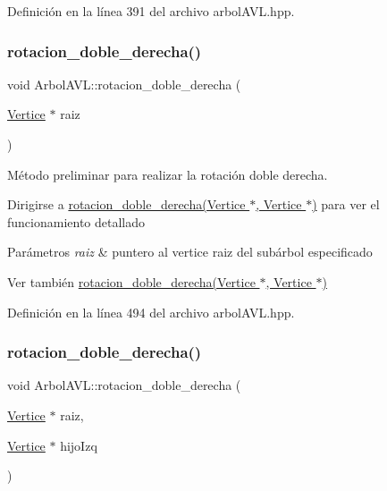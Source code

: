Definición en la línea 391 del archivo arbol\+A\+V\+L.\+hpp.

\mbox{\label{classArbolAVL_af75605601cca6de40f6e6f5b11bfce8e}} 
\subsubsection{\texorpdfstring{rotacion\+\_\+doble\+\_\+derecha()}{rotacion\_doble\_derecha()}\hspace{0.1cm}{\footnotesize\ttfamily [1/2]}}
{\footnotesize\ttfamily void Arbol\+A\+V\+L\+::rotacion\+\_\+doble\+\_\+derecha (\begin{DoxyParamCaption}\item[{\hyperlink{classVertice}{Vertice} $\ast$}]{raiz }\end{DoxyParamCaption})}



Método preliminar para realizar la rotación doble derecha. 

Dirigirse a \hyperlink{classArbolAVL_aa481f6a1014b68159b1fe753b96bde62}{rotacion\+\_\+doble\+\_\+derecha(\+Vertice $\ast$, Vertice $\ast$)} para ver el funcionamiento detallado 
\begin{DoxyParams}{Parámetros}
{\em raiz} & puntero al vertice raiz del subárbol especificado \\
\hline
\end{DoxyParams}
\begin{DoxySeeAlso}{Ver también}
\hyperlink{classArbolAVL_aa481f6a1014b68159b1fe753b96bde62}{rotacion\+\_\+doble\+\_\+derecha(\+Vertice $\ast$, Vertice $\ast$)} 
\end{DoxySeeAlso}


Definición en la línea 494 del archivo arbol\+A\+V\+L.\+hpp.

\mbox{\label{classArbolAVL_aa481f6a1014b68159b1fe753b96bde62}} 
\subsubsection{\texorpdfstring{rotacion\+\_\+doble\+\_\+derecha()}{rotacion\_doble\_derecha()}\hspace{0.1cm}{\footnotesize\ttfamily [2/2]}}
{\footnotesize\ttfamily void Arbol\+A\+V\+L\+::rotacion\+\_\+doble\+\_\+derecha (\begin{DoxyParamCaption}\item[{\hyperlink{classVertice}{Vertice} $\ast$}]{raiz,  }\item[{\hyperlink{classVertice}{Vertice} $\ast$}]{hijo\+Izq }\end{DoxyParamCaption})}



